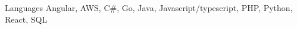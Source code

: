 
\begin{cvskills}

  \cvskill
    {Languages}
    {Angular, AWS, C\#, Go, Java, Javascript/typescript, PHP, Python, React, SQL}
\end{cvskills}
